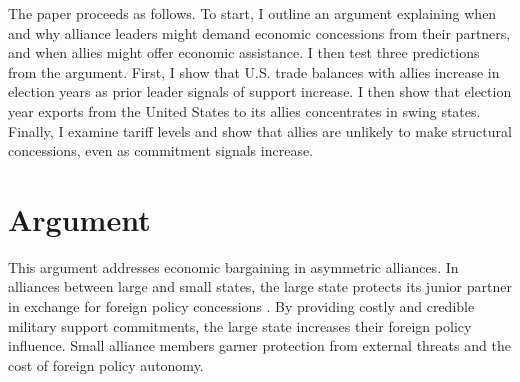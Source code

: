 \documentclass[12pt]{article}
\begin{document}
The paper proceeds as follows. 
To start, I outline an argument explaining when and why alliance leaders might demand economic concessions from their partners, and when allies might offer economic assistance. 
I then test three predictions from the argument. 
First, I show that U.S. trade balances with allies increase in election years as prior leader signals of support increase. 
I then show that election year exports from the United States to its allies concentrates in swing states. 
Finally, I examine tariff levels and show that allies are unlikely to make structural concessions, even as commitment signals increase. 


\section{Argument}


%
%
%


This argument addresses economic bargaining in asymmetric alliances. 
In alliances between large and small states, the large state protects its junior partner in exchange for foreign policy concessions \citep{Morrow1991}.
By providing costly and credible military support commitments, the large state increases their foreign policy influence. 
Small alliance members garner protection from external threats and the cost of foreign policy autonomy. 
\end{document}
